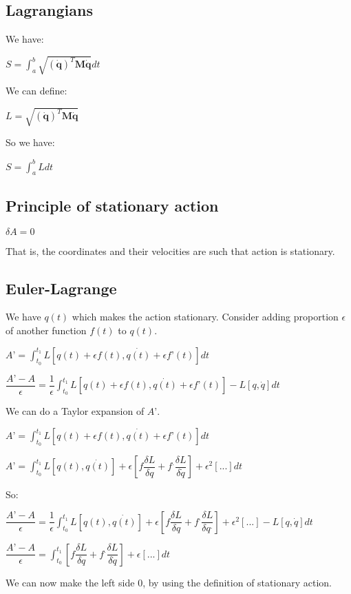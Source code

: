 
\subsection{Lagrangians}

We have:

\(S = \int_a^b \sqrt {(\mathbf {\dot q})^T\mathbf M\mathbf {\dot q}}dt\)

We can define:

\(L=\sqrt {(\mathbf {\dot q})^T\mathbf M\mathbf {\dot q}}\)

So we have:

\(S=\int_a^b L dt\)

\subsection{Principle of stationary action}

\(\delta A=0\)

That is, the coordinates and their velocities are such that action is stationary.

\subsection{Euler-Lagrange}

We have \(q(t)\) which makes the action stationary. Consider adding proportion \(\epsilon \) of another function \(f(t)\) to \(q(t)\).

\(A’=\int_{t_0}^{t_1} L[q(t)+\epsilon f(t), \dot {q(t)}+\epsilon f’(t)]dt\)

\(\dfrac{A’-A}{\epsilon }=\dfrac{1}{\epsilon}\int_{t_0}^{t_1} L[q(t)+\epsilon f(t), \dot {q(t)}+\epsilon f’(t)]-L[q,\dot q]dt\)

We can do a Taylor expansion of \(A’\).

\(A’=\int_{t_0}^{t_1} L[q(t)+\epsilon f(t), \dot {q(t)}+\epsilon f’(t)]dt\)

\(A’=\int_{t_0}^{t_1} L[q(t),\dot {q(t)}]+\epsilon [f\dfrac{\delta L}{\delta q}+f^.\dfrac{\delta L}{\delta \dot q}]+\epsilon^2 [...]dt\)

So:

\(\dfrac{A’-A}{\epsilon }=\dfrac{1}{\epsilon}\int_{t_0}^{t_1}L[q(t),\dot {q(t)}]+\epsilon [f\dfrac{\delta L}{\delta q}+f^.\dfrac{\delta L}{\delta q^.}]+\epsilon^2 [...]-L[q,\dot q]dt\)

\(\dfrac{A’-A}{\epsilon }=\int_{t_0}^{t_1}[f\dfrac{\delta L}{\delta q}+f^.\dfrac{\delta L}{\delta \dot {q}}]+\epsilon [...]dt\)

We can now make the left side \(0\), by using the definition of stationary action.

